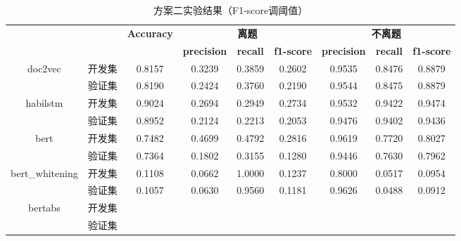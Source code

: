 \documentclass[11pt]{article}
\begin{document}
\begin{CJK}{UTF8}{gkai}
\begin{table}[htbp]\small
  \centering
  \begin{tabular}{cc|ccccccc}
    \hline
    \multicolumn{2}{c}{\multirow{2}[0]{*}{\textcolor[rgb]{ 1,  0,  0}{}}} & \multirow{2}[0]{*}{\textbf{Accuracy}} & \multicolumn{3}{c}{\textbf{离题}} & \multicolumn{3}{c}{\textbf{不离题}} \\
    \multicolumn{2}{c}{} &       & \textbf{precision} & \textbf{recall} & \textbf{f1-score} & \textbf{precision} & \textbf{recall} & \textbf{f1-score} \\
    \hline
    \multirow{2}[0]{*}{doc2vec} & 开发集   & 0.8157  & 0.3239  & 0.3859  & 0.2602  & 0.9535  & 0.8476  & 0.8879  \\
    & 验证集   & 0.8190  & 0.2424  & 0.3760  & 0.2190  & 0.9544  & 0.8475  & 0.8879  \\
    \hline
    \multirow{2}[0]{*}{habilstm} & 开发集   & 0.9024  & 0.2694  & 0.2949  & 0.2734  & 0.9532  & 0.9422  & 0.9474  \\
    & 验证集   & 0.8952  & 0.2124  & 0.2213  & 0.2053  & 0.9476  & 0.9402  & 0.9436  \\
    \hline
    \multirow{2}[0]{*}{bert} & 开发集   & 0.7482  & 0.4699  & 0.4792  & 0.2816  & 0.9619  & 0.7720  & 0.8027  \\
    & 验证集   & 0.7364  & 0.1802  & 0.3155  & 0.1280  & 0.9446  & 0.7630  & 0.7962  \\
    \hline
    \multirow{2}[0]{*}{bert\_whitening} & 开发集   & 0.1108  & 0.0662  & 1.0000  & 0.1237  & 0.8000  & 0.0517  & 0.0954  \\
    & 验证集   & 0.1057  & 0.0630  & 0.9560  & 0.1181  & 0.9626  & 0.0488  & 0.0912  \\
    \hline
    \multirow{2}[0]{*}{bertabs} & 开发集   &       &       &       &       &       &       &  \\
    & 验证集   &       &       &       &       &       &       &  \\
    \hline
  \end{tabular}%
  \caption{方案二实验结果（F1-score调阈值）}
  \label{tab:addlabel}%
\end{table}%



%
%
%

\end{CJK}
\end{document}
